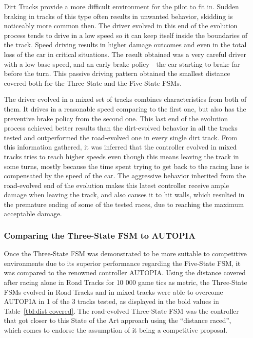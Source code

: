 	Dirt Tracks provide a more difficult environment for the pilot to fit in. Sudden braking in tracks of this type often results in unwanted behavior, skidding is noticeably more common then. The driver evolved in this end of the evolution process tends to drive in a low speed so it can keep itself inside the boundaries of the track. Speed driving results in higher damage outcomes and even in the total loss of the car in critical situations. The result obtained was a very careful driver with a low base-speed, and an early brake policy - the car starting to brake far before the turn. This passive driving pattern obtained the smallest distance covered both for the Three-State and the Five-State FSMs.
	
	The driver evolved in a mixed set of tracks combines characteristics from both of them. It drives in a reasonable speed comparing to the first one, but also has the preventive brake policy from the second one. This last end of the evolution process achieved better results than the dirt-evolved behavior in all the tracks tested and outperformed the road-evolved one in every single dirt track. From this information gathered, it was inferred that the controller evolved in mixed tracks tries to reach higher speeds even though this means leaving the track in some turns, mostly because the time spent trying to get back to the racing lane is compensated by the speed of the car. The aggressive behavior inherited from the road-evolved end of the evolution makes this latest controller receive ample damage when leaving the track, and also causes it to hit walls, which resulted in the premature ending of some of the tested races, due to reaching the maximum acceptable damage.
	
	
\subsubsection{Comparing the Three-State FSM to AUTOPIA} \label{subsubsec:CompAUTOPIA}

	Once the Three-State FSM was demonstrated to be more suitable to competitive environments due to its superior performance regarding the Five-State FSM, it was compared to the renowned controller AUTOPIA. Using the distance covered after racing alone in Road Tracks for 10 000 game tics as metric, the Three-State FSMs evolved in Road Tracks and in mixed tracks were able to overcome AUTOPIA in 1 of the 3 tracks tested, as displayed in the bold values in Table~\ref{tbl:dist covered}. The road-evolved Three-State FSM was the controller that got closer to this State of the Art approach using the ``distance raced'', which comes to endorse the assumption of it being a competitive proposal.
	
